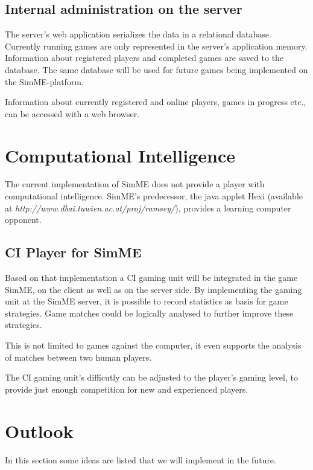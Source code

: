 	\subsection{Internal administration on the server}

		The server's web application serializes the data in a relational
		database. Currently running games are only represented in the server's
		application memory. Information about registered players and completed
		games are saved to the database. The same database will be used for
		future games being implemented on the SimME-platform.

		Information about currently registered and online players, games in
		progress etc., can be accessed with a web browser.


\section{Computational Intelligence} \label{sec:ci}

	The current implementation of SimME does not provide a player with
	computational intelligence. SimME's predecessor, the java applet Hexi
	\cite{slany_paper} (available at
	\textit{http://www.dbai.tuwien.ac.at/proj/ramsey/}), provides a learning
	computer opponent.

	\subsection{CI Player for SimME}

		Based on that implementation a CI gaming unit will be integrated in the
		game SimME, on the client as well as on the server side. By implementing
		the gaming unit at the SimME server, it is possible to record statistics
		as basis for game strategies. Game matches could be logically analysed
		to further improve these strategies.

		This is not limited to games against the computer, it even supports the
		analysis of matches between two human players.

		The CI gaming unit's difficutly can be adjusted to the player's gaming
		level, to provide just enough competition for new and experienced
		players.


\section{Outlook}

	In this section some ideas are listed that we will implement in the future.

